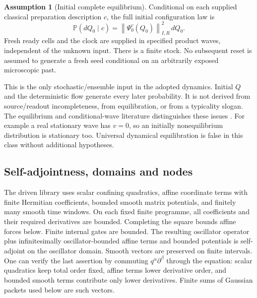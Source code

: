 \documentclass[11pt,oneside,openany]{book}
\theoremstyle{definition}
\newtheorem{assumption}[theorem]{Assumption}
\theoremstyle{remark}\newtheorem{remark}[theorem]{Remark}
\providecommand{\Prb}{\mathbb P}
\providecommand{\norm}[1]{\left\lVert#1\right\rVert}
\begin{document}
\begin{assumption}[Initial complete equilibrium]\label{mc:ax:eq}
Conditional on each supplied classical preparation description $c$, the full initial configuration law is
\begin{equation}\label{mc:eq:equilibrium}
 \Prb(dQ_0\mid c)=\norm{\Psi_0^c(Q_0)}_{I,R}^2\,dQ_0.
\end{equation}
Fresh ready cells and the clock are supplied in specified product waves, independent of the unknown input. There is a finite stock. No subsequent reset is assumed to generate a fresh seed conditional on an arbitrarily exposed microscopic past.
\end{assumption}
This is the only stochastic/ensemble input in the adopted dynamics. Initial $Q$ and the deterministic flow generate every later probability. It is not derived from source/readout incompleteness, from equilibration, or from a typicality slogan. The equilibrium and conditional-wave literature distinguishes these issues \cite{mc:DGZeq}. For example a real stationary wave has $v=0$, so an initially nonequilibrium distribution is stationary too. Universal dynamical equilibration is false in this class without additional hypotheses.

\subsection{Self-adjointness, domains and nodes}
The driven library uses scalar confining quadratics, affine coordinate terms with finite Hermitian coefficients, bounded smooth matrix potentials, and finitely many smooth time windows. On each fixed finite programme, all coefficients and their required derivatives are bounded. Completing the square bounds affine forces below. Finite internal gates are bounded. The resulting oscillator operator plus infinitesimally oscillator-bounded affine terms and bounded potentials is self-adjoint on the oscillator domain. Smooth vectors are preserved on finite intervals. One can verify the last assertion by commuting $q^\alpha\partial^\beta$ through the equation: scalar quadratics keep total order fixed, affine terms lower derivative order, and bounded smooth terms contribute only lower derivatives. Finite sums of Gaussian packets used below are such vectors.
\end{document}
